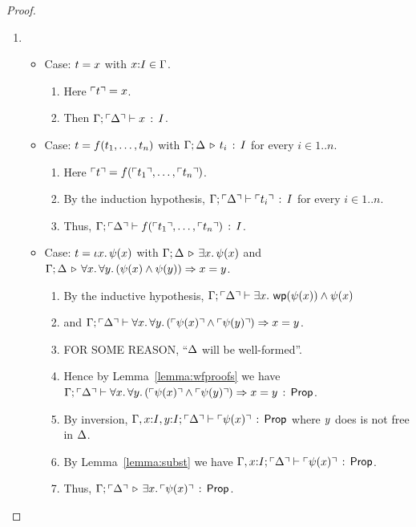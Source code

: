 \documentclass[10pt,a4paper]{article}
\begin{document}
\begin{proof}
\mbox{}

\begin{enumerate}
\item %
  \begin{itemize}
  \item Case: $t = x$ with $x{:}I\in\Gamma$.
    \begin{enumerate}
    \item 
      Here $\ulcorner t \urcorner = x$.
    \item 
      Then $\Gamma;\ulcorner \Delta \urcorner \vdash x\, :\, I$.
    \end{enumerate}
  \item Case: $t = f({t}_1,\ldots,{t}_{n})$ with $\Gamma;\Delta \,\triangleright\, t_i\, :\, I$ for every $i\in1..n$.
    \begin{enumerate}
    \item 
      Here $\ulcorner t \urcorner = f(\ulcorner t_1 \urcorner,\ldots,\ulcorner t_n \urcorner)$.
    \item 
      By the induction hypothesis, $\Gamma;\ulcorner \Delta \urcorner \vdash \ulcorner t_i \urcorner\, :\, I$ for every $i\in1..n$.
    \item 
      Thus, $\Gamma;\ulcorner \Delta \urcorner \vdash f(\ulcorner t_1 \urcorner,\ldots,\ulcorner t_n \urcorner)\, :\, I$.
    \end{enumerate}
  \item Case: $t = \iota x.\, \psi(x)$ with
     $\Gamma;\Delta \,\triangleright\, \exists x.\, \psi(x)$ and
     $\Gamma;\Delta \,\triangleright\, \forall x.\, \forall y.\, (\psi(x) \wedge \psi(y)) \Rightarrow x = y$.
     \begin{enumerate}
     \item 
       \label{lemma:l41:proofline:a2}
       By the inductive hypothesis, 
     $\Gamma;\ulcorner \Delta \urcorner \vdash \exists x.\, \mathop{\mathsf{wp}}(\psi(x)) \wedge \psi(x)$
     \item
       and
       $\Gamma;\ulcorner \Delta \urcorner \vdash \forall x.\, \forall y.\, (\ulcorner \psi(x) \urcorner \wedge \ulcorner \psi(y) \urcorner) \Rightarrow x = y$.
     \item 
       FOR SOME REASON, ``$\Delta$ will be well-formed''.
     \item 
       Hence by Lemma~\ref{lemma:wfproofs} we have
       $\Gamma;\ulcorner \Delta \urcorner \vdash \forall x.\, \forall y.\, (\ulcorner \psi(x) \urcorner \wedge \ulcorner \psi(y) \urcorner) \Rightarrow x = y\, :\, \mathsf{Prop}$.
     \item 
       By inversion,
       $\Gamma,x{:}I,y{:}I;\ulcorner \Delta \urcorner \vdash \ulcorner \psi(x) \urcorner\, :\, \mathsf{Prop}$
       where $y$ does is not free in $\Delta$.
     \item
       By Lemma~\ref{lemma:subst} we have
       $\Gamma,x{:}I;\ulcorner \Delta \urcorner \vdash \ulcorner \psi(x) \urcorner\, :\, \mathsf{Prop}$.
     \item
       \label{lemma:l41:proofline:a1}
       Thus, $\Gamma;\ulcorner \Delta \urcorner \,\triangleright\, \exists x.\, \ulcorner \psi(x) \urcorner\,:\, \mathsf{Prop}$.
\smallskip


\end{enumerate}
\end{itemize}
\end{enumerate}
\end{proof}
\end{document}
